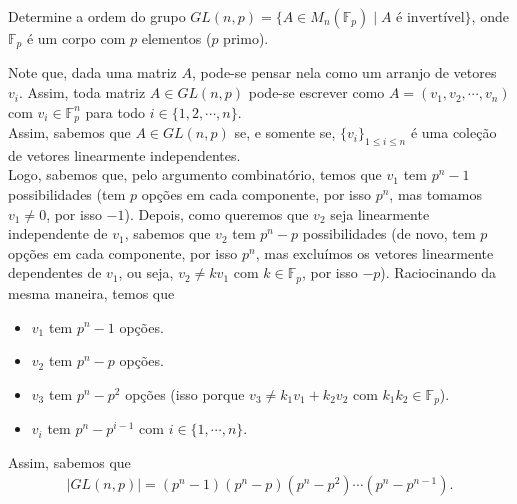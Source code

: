 \begin{homeworkProblem}
  Determine a ordem do grupo $GL(n,p) = \{A \in M_n(\mathbb{F}_p) \mid A \text{ é invertível}\}$, onde $\mathbb{F}_p$ é um corpo com $p$ elementos ($p$ primo).
  \begin{solution}
    Note que, dada uma matriz $A$, pode-se pensar nela como um arranjo de vetores $v_i$. Assim, toda matriz $A\in GL(n,p)$ pode-se escrever como $A=(v_1,v_2,\cdots,v_n)$ com $v_i\in \mathbb{F}_{p}^{n}$ para todo $i\in\{1,2,\cdots,n\}$.\\
    Assim, sabemos que $A\in GL(n,p)$ se, e somente se, $\{v_i\}_{1\leq i\leq n}$ é uma coleção de vetores linearmente independentes.\\
    Logo, sabemos que, pelo argumento combinatório, temos que $v_1$ tem $p^{n}-1$ possibilidades (tem $p$ opções em cada componente, por isso $p^{n}$, mas tomamos $v_1\neq 0$, por isso $-1$). Depois, como queremos que $v_2$ seja linearmente independente de $v_1$, sabemos que $v_2$ tem $p^{n}-p$ possibilidades (de novo, tem $p$ opções em cada componente, por isso $p^{n}$, mas excluímos os vetores linearmente dependentes de $v_1$, ou seja, $v_2\neq kv_1$ com $k\in\mathbb{F}_p$, por isso $-p$). Raciocinando da mesma maneira, temos que
    \begin{itemize}
      \item $v_1$ tem $p^{n}-1$ opções.
      \item $v_2$ tem $p^{n}-p$ opções.
      \item $v_3$ tem $p^{n}-p^{2}$ opções (isso porque $v_3\neq k_1v_1+k_2v_2$ com $k_1k_2\in \mathbb{F}_p$).
      \item $v_i$ tem $p^{n}-p^{i-1}$ com $i\in\{1,\cdots, n\}$. 
    \end{itemize}
    Assim, sabemos que
    \begin{align*}
      |GL(n,p)|=(p^{n}-1)(p^{n}-p)(p^{n}-p^{2})\cdots(p^{n}-p^{n-1}).
    \end{align*}
  \end{solution}
\end{homeworkProblem}
